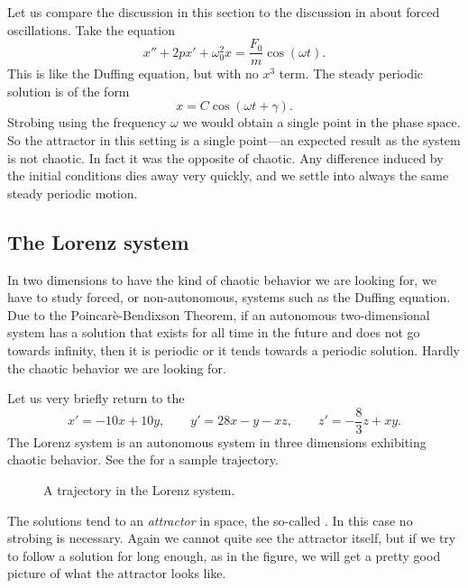 Let us
compare the discussion in this section to the discussion in  about forced
oscillations.  Take the equation
\begin{equation*}
x''+2p x' + \omega_0^2 x = \frac{F_0}{m} \cos (\omega t) .
\end{equation*}
This is like the Duffing equation, but with no $x^3$ term.
The steady periodic solution is of the form
\begin{equation*}
x = C \cos (\omega t + \gamma) .
\end{equation*}
Strobing using the frequency $\omega$ we would obtain a single point in the
phase space.  So the attractor in this setting is a single point---an
expected result as the system is not chaotic.  In fact it was the opposite
of chaotic.  Any difference induced by the initial conditions dies away very
quickly, and we settle into always the same steady periodic motion.

\subsection{The Lorenz system}

In two dimensions to have the kind of chaotic behavior we are looking for,
we have to study forced, or non-autonomous, systems such as the Duffing
equation.
Due to the Poincar\`e-Bendixson Theorem, if an autonomous
two-dimensional system has a solution that exists for all time in the future
and does not go towards infinity,
then it is periodic or it tends towards a periodic solution.  Hardly the chaotic
behavior we are looking for.

Let us very briefly return to the 
\begin{equation*}
x' = -10x +10y, \qquad y' = 28x-y-xz, \qquad z'=-\frac{8}{3}z + xy .
\end{equation*}
The Lorenz system is an autonomous system in three dimensions
exhibiting chaotic behavior.
See the  for a sample trajectory.
\begin{figure}[h!t]
\capstart
\begin{center}
\caption{A trajectory in the Lorenz system. \label{nlin:lorenz}}
\end{center}
\end{figure}

The solutions tend to an \emph{attractor} in space,
the so-called \emph{}.  In this case no strobing is
necessary.
Again we cannot quite see the attractor itself, but if we try to follow a solution
for long enough, as in the figure,
we will get a pretty good picture of what the attractor looks
like.

